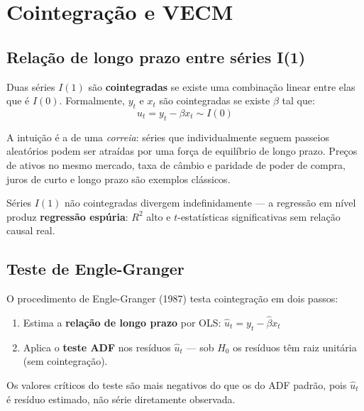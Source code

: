 \chapter{Cointegração e VECM}
\label{cap:coint}

\section{Relação de longo prazo entre séries I(1)}

Duas séries $I(1)$ são \textbf{cointegradas} se existe uma combinação linear
entre elas que é $I(0)$. Formalmente, $y_t$ e $x_t$ são cointegradas se
existe $\beta$ tal que:
\[
  u_t = y_t - \beta x_t \sim I(0)
\]

A intuição é a de uma \emph{correia}: séries que individualmente seguem
passeios aleatórios podem ser atraídas por uma força de equilíbrio de longo
prazo. Preços de ativos no mesmo mercado, taxa de câmbio e paridade de poder
de compra, juros de curto e longo prazo são exemplos clássicos.

Séries $I(1)$ não cointegradas divergem indefinidamente — a regressão em
nível produz \textbf{regressão espúria}: $R^2$ alto e $t$-estatísticas
significativas sem relação causal real.

\section{Teste de Engle-Granger}

O procedimento de Engle-Granger (1987) testa cointegração em dois passos:

\begin{enumerate}
  \item Estima a \textbf{relação de longo prazo} por OLS:
        $\hat u_t = y_t - \hat\beta x_t$
  \item Aplica o \textbf{teste ADF} nos resíduos $\hat u_t$ — sob $H_0$
        os resíduos têm raiz unitária (sem cointegração).
\end{enumerate}

Os valores críticos do teste são mais negativos do que os do ADF padrão,
pois $\hat u_t$ é resíduo estimado, não série diretamente observada.

